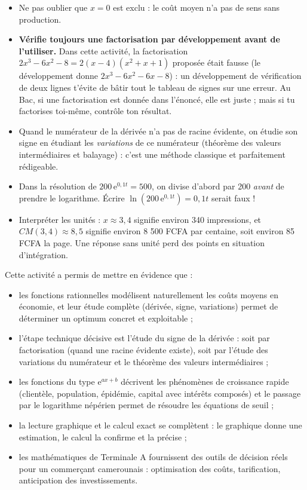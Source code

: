\documentclass[11pt]{article}
\newcommand{\cle}[1]{{\popxbold\color{popdark}#1}}
\newcounter{popsec}
\newcounter{popsub}
\newcommand{\courssub}[1]{%
  \stepcounter{popsub}%
  \par\vspace{9pt}\noindent{\popxbold\fontsize{11.5}{13}\selectfont\color{popink}{\color{poporange}\thepopsec.\thepopsub}\hspace{6pt}#1}\par\nopagebreak\vspace{4pt}
}
\begin{document}
\begin{attention}
\begin{itemize}
\item Ne pas oublier que $x = 0$ est exclu : le coût moyen n'a pas de sens sans production.
\item \textbf{Vérifie toujours une factorisation par développement avant de l'utiliser.} Dans cette activité, la factorisation $2x^3 - 6x^2 - 8 = 2(x-4)(x^2+x+1)$ proposée était fausse (le développement donne $2x^3 - 6x^2 - 6x - 8$) : un développement de vérification de deux lignes t'évite de bâtir tout le tableau de signes sur une erreur. Au Bac, si une factorisation est donnée dans l'énoncé, elle est juste ; mais si tu factorises toi-même, contrôle ton résultat.
\item Quand le numérateur de la dérivée n'a pas de racine évidente, on étudie son signe en étudiant les \emph{variations} de ce numérateur (théorème des valeurs intermédiaires et balayage) : c'est une méthode classique et parfaitement rédigeable.
\item Dans la résolution de $200\,\mathrm{e}^{0{,}1t} = 500$, on divise d'abord par 200 \emph{avant} de prendre le logarithme. Écrire $\ln\left(200\,\mathrm{e}^{0{,}1t}\right) = 0{,}1t$ serait faux !
\item Interpréter les unités : $x \approx 3{,}4$ signifie environ 340 impressions, et $CM(3{,}4) \approx 8{,}5$ signifie environ 8 500 FCFA par centaine, soit environ 85 FCFA la page. Une réponse sans unité perd des points en situation d'intégration.
\end{itemize}
\end{attention}

\courssub{Bilan de l'activité}

Cette activité a permis de mettre en évidence que :

\begin{itemize}
\item les fonctions rationnelles modélisent naturellement les \cle{coûts moyens} en économie, et leur étude complète (dérivée, signe, variations) permet de déterminer un \cle{optimum} concret et exploitable ;
\item l'étape technique décisive est l'étude du signe de la dérivée : soit par factorisation (quand une racine évidente existe), soit par l'étude des variations du numérateur et le théorème des valeurs intermédiaires ;
\item les fonctions du type $\mathrm{e}^{ax+b}$ décrivent les phénomènes de \cle{croissance rapide} (clientèle, population, épidémie, capital avec intérêts composés) et le passage par le logarithme népérien permet de résoudre les équations de seuil ;
\item la lecture graphique et le calcul exact se complètent : le graphique donne une estimation, le calcul la confirme et la précise ;
\item les mathématiques de Terminale A fournissent des outils de décision réels pour un commerçant camerounais : optimisation des coûts, tarification, anticipation des investissements.
\end{itemize}
\end{document}
